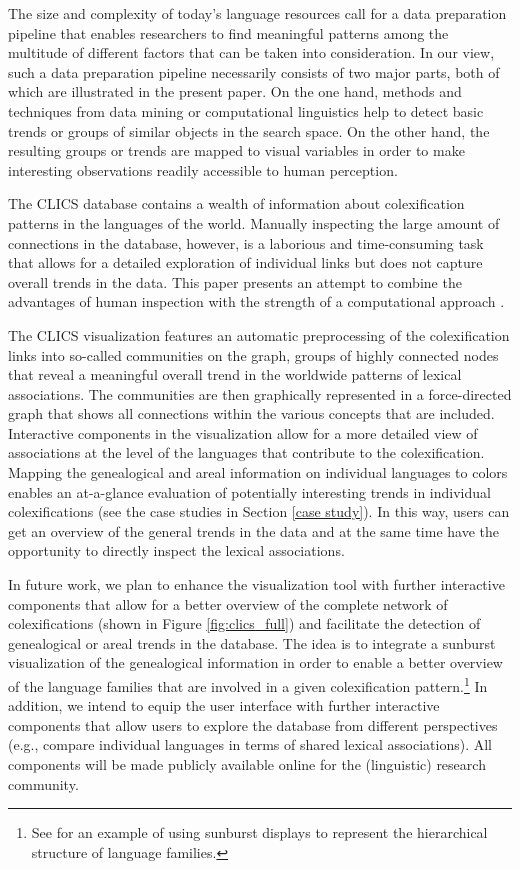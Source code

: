 \documentclass[10pt, a4paper]{article}
\begin{document}
The size and complexity of today's language resources call for a data preparation pipeline that enables researchers to find meaningful patterns among the multitude of different factors that can be taken into consideration. In our view, such a data preparation pipeline necessarily consists of two major parts, both of which are illustrated in the present paper. On the one hand, methods and techniques from data mining or computational linguistics help to detect basic trends or groups of similar objects in the search space. On the other hand, the resulting groups or trends are mapped to visual variables in order to make interesting observations readily accessible to human perception. 

The CLICS database contains a wealth of information about colexification patterns in the languages of the world. Manually inspecting the large amount of connections in the database, however, is a laborious and time-consuming task that allows for a detailed exploration of individual links but does not capture overall trends in the data. This paper presents an attempt to combine the advantages of human inspection with the strength of a computational approach \cite{Keim2008}. 

The CLICS visualization features an automatic preprocessing of the colexification links into so-called communities on the graph, groups of highly connected nodes that reveal a meaningful overall trend in the worldwide patterns of lexical associations. The communities are then graphically represented in a force-directed graph that shows all connections within the various concepts that are included. Interactive components in the visualization allow for a more detailed view of associations at the level of the languages that contribute to the colexification. 
Mapping the genealogical and areal information on individual languages to colors enables an at-a-glance evaluation of potentially interesting trends in individual colexifications (see the case studies in Section \ref{case study}). 
In this way, users can get an overview of the general trends in the data and at the same time have the opportunity to directly inspect the lexical associations. 

In future work, we plan to enhance the visualization tool with further interactive components that allow for a better overview of the complete network of colexifications (shown in Figure \ref{fig:clics_full}) and facilitate the detection of genealogical or areal trends in the database. The idea is to integrate a sunburst visualization \cite{Sunburst}  of the genealogical information in order to enable a better overview of the language families that are involved in a given colexification pattern.\footnote{See  for an example of using sunburst displays to represent the hierarchical structure of language families.} In addition, we intend to equip the user interface with further interactive components that allow users to explore the database from different perspectives (e.g., compare individual languages in terms of shared lexical associations). All components will be made publicly available online for the (linguistic) research community. 
\end{document}
